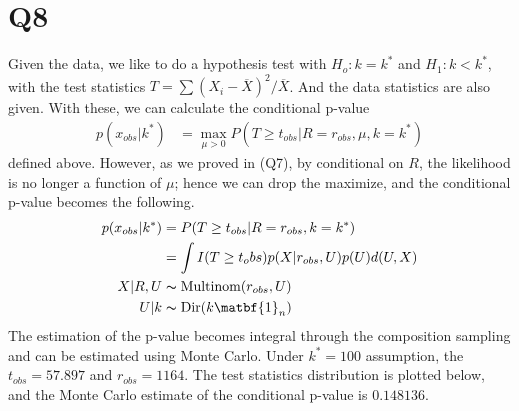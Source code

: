 \documentclass[11pt, letterpaper]{article}
\begin{document}
\section{Q8}
Given the data, we like to do a hypothesis test with $H_o: k = k^*$ and $H_1: k < k^*$, with the test statistics $T = \sum(X_i-\overline{X})^2/\overline{X}$. And the data statistics are also given. With these, we can calculate the conditional p-value
\begin{align*}
    p(x_{obs}|k^*) &= \mathop{max}_{\mu>0} P(T\ge t_{obs}|R=r_{obs}, \mu, k=k^*)
\end{align*}
defined above. However, as we proved in (Q7), by conditional on $R$, the likelihood is no longer a function of $\mu$; hence we can drop the maximize, and the conditional p-value becomes the following.
\begin{align*}
    p(x_{obs}|k^*) &= P(T\ge t_{obs}|R=r_{obs}, k=k^*) \\
        &= \int I(T\ge t_obs) p(X|r_{obs}, U) p(U) d(U, X) \\
        X|R, U &\thicksim \text{Multinom}(r_{obs}, U) \\
        U|k &\thicksim \text{Dir}(k\matbf{1}_n)
\end{align*}
The estimation of the p-value becomes integral through the composition sampling and can be estimated using Monte Carlo. Under $k^* = 100$ assumption, the $t_{obs} = 57.897$ and $r_{obs} = 1164$. The test statistics distribution is plotted below, and the Monte Carlo estimate of the conditional p-value is $0.148136$.
\end{document}
